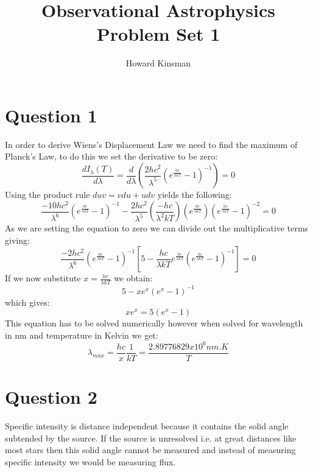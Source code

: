 \documentclass[a4paper,12pt]{article}
\author{Howard Kinsman}
\title{Observational Astrophysics Problem Set 1}
\begin{document}
\maketitle
\section{Question 1}
In order to derive Wiens's Displacement Law we need to find the maximum of Planck's Law, to do this we set the derivative to be zero: 
\begin{equation}
\frac{dI_\lambda(T)}{d\lambda} = \frac{d}{d\lambda}\left(\frac{2hc^2}{\lambda^5}\left(e^{\frac{hc}{\lambda kT}}-1\right)^{-1}\right) = 0
\end{equation}
Using the product rule $duv=vdu+udv$ yields the following:
\begin{equation}
\frac{-10hc^2}{\lambda^6}\left(e^{\frac{hc}{\lambda kT}}-1\right)^{-1}-\frac{2hc^2}{\lambda^5}\left(\frac{-hc}{\lambda^2kT}\right)\left(e^{\frac{hc}{\lambda kT}}\right)\left(e^{\frac{hc}{\lambda kT}}-1\right)^{-2} = 0
\end{equation}
As we are setting the equation to zero we can divide out the multiplicative terms giving:
\begin{equation}
\frac{-2hc^2}{\lambda^6}\left(e^{\frac{hc}{\lambda kT}}-1\right)^{-1}\left[5-\frac{hc}{\lambda kT}e^{\frac{hc}{\lambda kT}}\left(e^{\frac{hc}{\lambda kT}}-1\right)^{-1}\right] = 0
\end{equation}
If we now substitute $x=\frac{hc}{\lambda kT}$ we obtain:
\begin{equation}
5-xe^x\left(e^x-1\right)^{-1}
\end{equation}
which gives:
\begin{equation}
xe^x = 5(e^x-1)
\end{equation}
This equation has to be solved numerically however when solved for wavelength in nm and temperature in Kelvin we get:
\begin{equation}
\lambda_{max}=\frac{hc}{x}\frac{1}{kT}=\frac{2.89776829x10^6 nm . K}{T}
\end{equation}

\section{Question 2}
Specific intensity is distance independent because it contains the solid angle subtended by the source. If the source is unresolved i.e. at great distances like most stars
then this solid angle cannot be measured and instead of measuring specific intensity we would be measuring flux.
\end{document}
